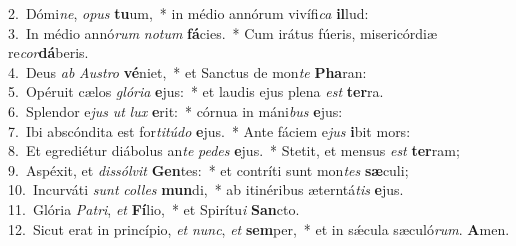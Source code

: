 {2.~}Dómi\textit{ne}, \textit{o}\textit{pus} \textbf{tu}um,~* in médio annórum vivífi\textit{ca} \textbf{il}lud:\\
{3.~}In médio annó\textit{rum} \textit{no}\textit{tum} \textbf{fá}cies.~* Cum irátus fúeris, misericórdiæ re\textit{cor}\textbf{dá}beris.\\
{4.~}Deus \textit{ab} \textit{Au}\textit{stro} \textbf{vé}niet,~* et Sanctus de mon\textit{te} \textbf{Pha}ran:\\
{5.~}Opéruit cælos \textit{gló}\textit{ri}\textit{a} \textbf{e}jus:~* et laudis ejus plena \textit{est} \textbf{ter}ra.\\
{6.~}Splendor e\textit{jus} \textit{ut} \textit{lux} \textbf{e}rit:~* córnua in máni\textit{bus} \textbf{e}jus:\\
{7.~}Ibi abscóndita est for\textit{ti}\textit{tú}\textit{do} \textbf{e}jus.~* Ante fáciem e\textit{jus} \textbf{i}bit mors:\\
{8.~}Et egrediétur diábolus an\textit{te} \textit{pe}\textit{des} \textbf{e}jus.~* Stetit, et mensus \textit{est} \textbf{ter}ram;\\
{9.~}Aspéxit, et \textit{dis}\textit{sól}\textit{vit} \textbf{Gen}tes:~* et contríti sunt mon\textit{tes} \textbf{sæ}culi;\\
{10.~}Incurváti \textit{sunt} \textit{col}\textit{les} \textbf{mun}di,~* ab itinéribus æterntá\textit{tis} \textbf{e}jus.\\
{11.~}Glória \textit{Pa}\textit{tri}, \textit{et} \textbf{Fí}lio,~* et Spirítu\textit{i} \textbf{San}cto.\\
{12.~}Sicut erat in princípio, \textit{et} \textit{nunc}, \textit{et} \textbf{sem}per,~* et in sǽcula sæculó\textit{rum}. \textbf{A}men.\\
